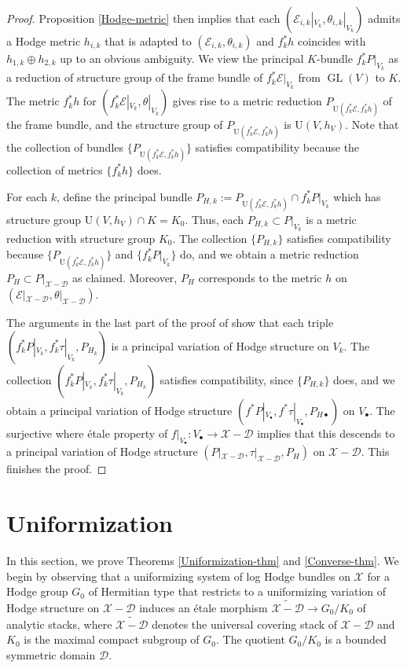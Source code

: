 \documentclass[a4paper]{amsart}
\theoremstyle{definition}
\def\gl{\mathop{\mathrm{GL}}\nolimits}
\begin{document}
\begin{proof}
Proposition \ref{Hodge-metric} then implies that each $(\mathcal{E}_{i,k}|_{V_k},\theta_{i,k}|_{V_k})$ admits a Hodge metric $h_{i,k}$ that is adapted to $(\mathcal{E}_{i,k},\theta_{i,k})$ and $f_k^*h$ coincides with $h_{1,k}\oplus h_{2,k}$ up to an obvious ambiguity. We view the principal $K$-bundle $f_k^*P|_{V_k}$ as a reduction of structure group of the frame bundle of $f_k^*\mathcal{E}|_{V_k}$ from $\gl(V)$ to $K$. The metric $f_k^*h$ for $(f_k^*\mathcal{E}|_{V_k},\theta|_{V_k})$ gives rise to a metric reduction $P_{\mathrm{U}(f_k^*\mathcal{E},f_k^*h)}$ of the frame bundle, and the structure group of $P_{\mathrm{U}(f_k^*\mathcal{E},f_k^*h)}$ is $\mathrm{U}(V,h_V)$. Note that the collection of bundles $\{P_{\mathrm{U}(f_k^*\mathcal{E},f_k^*h)}\}$ satisfies compatibility because the collection of metrics $\{f_k^*h\}$ does.

For each $k$, define the principal bundle $P_{H,k}:=P_{\mathrm{U}(f_k^*\mathcal{E},f_k^*h)}\cap f_k^*P|_{V_k}$ which has structure group $\mathrm{U}(V,h_V)\cap K=K_0$. Thus, each $P_{H,k}\subset P|_{V_k}$ is a metric reduction with structure group $K_0$. The collection $\{P_{H,k}\}$ satisfies compatibility because $\{P_{\mathrm{U}(f_k^*\mathcal{E},f_k^*h)}\}$ and $\{f_k^*P|_{V_k}\}$ do, and we obtain a metric reduction $P_H\subset P|_{\mathscr{X}-\mathscr{D}}$ as claimed. Moreover, $P_H$ corresponds to the metric $h$ on $(\mathcal{E}|_{\mathscr{X}-\mathscr{D}},\theta|_{\mathscr{X}-\mathscr{D}})$.

The arguments in the last part of the proof of \cite[Theorem 4.1]{dengcadorel} show that each triple $(f_k^*P|_{V_k},f_k^*\tau|_{V_k},P_{H_k})$ is a principal variation of Hodge structure on $V_k$. The collection $(f_k^*P|_{V_k},f_k^*\tau|_{V_k},P_{H_k})$ satisfies compatibility, since $\{P_{H,k}\}$ does, and we obtain a principal variation of Hodge structure $(f^*P|_{V_\bullet},f^*\tau|_{V_\bullet},P_{H\bullet})$ on $V_\bullet$. The surjective where \'etale property of $f|_{V_\bullet}:V_\bullet\to\mathscr{X}-\mathscr{D}$ implies that this descends to a principal variation of Hodge structure $(P|_{\mathscr{X}-\mathscr{D}},\tau|_{\mathscr{X}-\mathscr{D}},P_H)$ on $\mathscr{X}-\mathscr{D}$. This finishes the proof.
\end{proof}

\section{Uniformization}

In this section, we prove Theorems \ref{Uniformization-thm} and \ref{Converse-thm}. We begin by observing that a uniformizing system of log Hodge bundles on $\mathscr{X}$ for a Hodge group $G_0$ of Hermitian type that restricts to a uniformizing variation of Hodge structure on $\mathscr{X}-\mathscr{D}$ induces an \'etale morphism $\widetilde{\mathscr{X}-\mathscr{D}}\to G_0/K_0$ of analytic stacks, where $\widetilde{\mathscr{X}-\mathscr{D}}$ denotes the universal covering stack of $\mathscr{X}-\mathscr{D}$ and $K_0$ is the maximal compact subgroup of $G_0$. The quotient $G_0/K_0$ is a bounded symmetric domain $\mathcal{D}$.  
\end{document}

